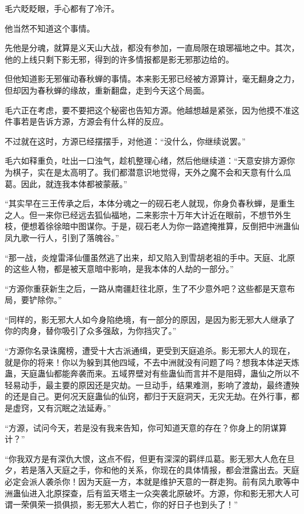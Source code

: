 \begin{this_body}
毛六眨眨眼，手心都有了冷汗。

他当然不知道这个事情。

先他是分魂，就算是义天山大战，都没有参加，一直局限在琅琊福地之中。其次，他的上线只剩下影无邪，得到的许多情报都是影无邪那边给的。

但他知道影无邪催动春秋蝉的事情。本来影无邪已经被方源算计，毫无翻身之力，但却因为春秋蝉的缘故，重新翻盘，走到今天这个局面。

毛六正在考虑，要不要把这个秘密也告知方源。他越想越是紧张，因为他摸不准这件事若是告诉方源，方源会有什么样的反应。

不过就在这时，方源已经摆摆手，对他道：“没什么，你继续说罢。”

毛六如释重负，吐出一口浊气，趁机整理心绪，然后他继续道：“天意安排方源你为棋子，实在是太高明了。我们都潜意识地觉得，天外之魔不会和天意有什么瓜葛。因此，就连我本体都被蒙蔽。”

“其实早在三王传承之后，本体分魂之一的砚石老人就现，你身负春秋蝉，是重生之人。但一来你已经远去狐仙福地，二来影宗十万年大计近在眼前，不想节外生枝，便想着徐徐暗中图谋你。于是，砚石老人为你一路遮掩推算，反倒把中洲蛊仙凤九歌一行人，引到了落魄谷。”

“那一战，炎煌雷泽仙僵虽然逃了出来，却又陷入到雪胡老祖的手中。天庭、北原的这些人物，都是被天意暗中影响，是我本体的人劫的一部分。”

“方源你重获新生之后，一路从南疆赶往北原，生了不少意外吧？这些都是天意布局，要铲除你。”

“同样的，影无邪大人如今身陷绝境，有一部分的原因，是因为影无邪大人继承了你的肉身，替你吸引了众多强敌，为你挡灾了。”

“方源你名录诛魔榜，遭受十大古派通缉，更受到天庭追杀。影无邪大人的现在，就是你的将来！你以为躲到其他四域，不去中洲就没有问题了吗？想我本体逆天炼蛊，天庭蛊仙都能奔袭而来。五域界壁对有些蛊仙而言并不是阻碍，蛊仙之所以不轻易动手，最主要的原因还是灾劫。一旦动手，结果难测，影响了渡劫，最终遭殃的还是自己。更何况天庭蛊仙的仙窍，都归于天庭洞天，无灾无劫。在外行事，都是虚窍，又有沉眠之法延寿。”

“方源，试问今天，若是没有我来告知，你可知道天意的存在？你身上的阴谋算计？”

“你我双方是有深仇大恨，这点不假，但更有深深的羁绊瓜葛。影无邪大人危在旦夕，若是落入天庭之手，你和他的关系，你现在的具体情报，都会泄露出去。天庭必定会派人袭杀你！因为天庭一方，本就是维护天意的一群走狗。前有凤九歌等中洲蛊仙进入北原探查，后有监天塔主一众突袭北原破坏。方源，你和影无邪大人可谓一荣俱荣一损俱损，影无邪大人若亡，你的好日子也到头了！”


\end{this_body}
